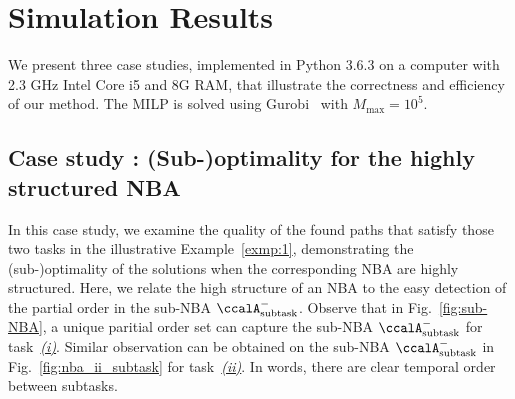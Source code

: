 \documentclass[Afour,sageh,times]{sagej}
\newcommand{\auto}[1]{\ccalA_{\textup{#1}}}
\newcommand{\RNum}[1]{\uppercase\expandafter{\romannumeral #1\relax}}
\begin{document}
{ %
\section{Simulation Results}\label{sec:sim}
We present three case studies, implemented in Python 3.6.3 on a computer with 2.3 GHz Intel Core i5 and 8G RAM, that illustrate the correctness and efficiency of our method. The MILP is solved using Gurobi~\citep{gurobi} with $M_{\text{max}}=10^5$. %

\subsection{Case study \RNum{1}: (Sub-)optimality for the highly structured NBA}
In this case study, we examine the quality of the found paths that satisfy those two tasks in the illustrative Example~\ref{exmp:1}, demonstrating the (sub-)optimality of the solutions when the corresponding NBA are highly structured. Here, we relate the high structure of an NBA to the easy detection of the  partial order in the sub-NBA $\auto{subtask}^-$. Observe that in Fig.~\ref{fig:sub-NBA}, a unique paritial order set can capture the sub-NBA $\auto{subtask}^-$ for task~\hyperref[task:i]{\it (i)}. Similar observation can be obtained  on the sub-NBA $\auto{subtask}^-$ in Fig.~\ref{fig:nba_ii_subtask} for task~\hyperref[task:ii]{\it (ii)}. In words, there are clear temporal order between subtasks.

}
\end{document}
